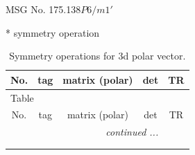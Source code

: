 \documentclass[fleqn,8pt]{jsarticle}
\begin{document}
\setcounter{MaxMatrixCols}{32}

\renewcommand{\tablename}{Table~}
\renewcommand{\figurename}{Figure~}
\begin{center}
\LARGE
MSG No. 175.138\quad$P6/m1'$
\end{center}
* symmetry operation
\renewcommand{\arraystretch}{1.3}
\begin{longtable}{ccccc}
\caption{Symmetry operations for 3d polar vector.}
 \\
 \hline \hline
No. & tag & matrix (polar) & det & TR \\ \hline \endfirsthead

\multicolumn{4}{l}{\tablename\ \thetable{}} \\
 \hline \hline
No. & tag & matrix (polar) & det & TR \\ \hline \endhead

 \hline \hline
\multicolumn{4}{r}{\footnotesize\it continued ...} \\ \endfoot

 \hline \hline
\multicolumn{4}{r}{} \\ \endlastfoot


\end{longtable}
\end{document}
